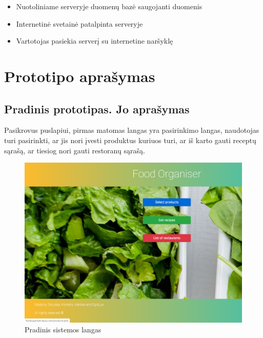 \documentclass{VUMIFInfKursinis}
\begin{document}
\begin{small}
\begin{itemize}[noitemsep,topsep=0pt]
\setlength\itemsep{0em}
\item {Nuotoliniame serveryje duomenų bazė saugojanti duomenis}
\item {Internetinė svetainė patalpinta serveryje}
\item {Vartotojas pasiekia serverį su internetine naršyklę}
\end{itemize}

\end{small}

\section{Prototipo aprašymas}

\subsection{Pradinis prototipas. Jo aprašymas}
Pasikrovus puslapiui, pirmas matomas langas yra pasirinkimo langas, naudotojas turi pasirinkti, ar jis nori įvesti produktus kuriuos turi, ar iš karto gauti receptų sąrašą, ar tiesiog nori gauti restoranų sąrašą.

\begin{figure}[H]
    \centering
 \includegraphics[scale=0.5]{img/startWindow}
    \caption{Pradinis sistemos langas}   %
    \label{img:mlp}
\end{figure}
\bigskip
\end{document}
